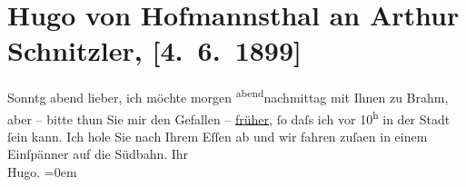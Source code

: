 

         
         \renewcommand{\erwaehntePersonen}{Personen: Otto Brahm}
         \renewcommand{\erwaehnteOrte}{Orte: Südbahnhof, Wien}
         \renewcommand{\erwaehnteWerke}{}
               \section[Hugo von Hofmannsthal an Arthur Schnitzler, {[}4. 6. 1899{]}]{ Hugo von Hofmannsthal an Arthur Schnitzler, {[}4. 6. 1899{]}}\nopagebreak{}\rehead{ }\begin{ledgroupsized}[t]{13cm}\normalsize\beginnumbering \toendnotes[C]{\smallbreak\pagebreak[2]} 
\pstart
           \raggedleft{}{\pb}Sonntg abend\pend
           \pstart
           lieber, ich möchte morgen \substVorne{}\textsuperscript{abend}\substDazwischen{}nachmittag\substHinten{} mit Ihnen zu Brahm, aber – bitte thun
               Sie mir den Gefallen – \uline{früher}, ſo daſs ich vor
                     10\textsuperscript{h} in der Stadt ſein kann. Ich hole Sie nach Ihrem Eſſen ab und wir fahren
                  zuſa{\geminationm}en in einem Einſpänner auf die Südbahn.\pend
           \pstart
           Ihr{\\[\baselineskip]}\spacefill\mbox{Hugo.}\pend
           \leftskip=0em{}
         
         \endnumbering{}\end{ledgroupsized}  \newcommand{\dateiname}{L00922}\newcommand{\titel}{Hugo von Hofmannsthal an Arthur Schnitzler, [4. 6. 1899]}\newcommand{\editorInnen}{Martin Anton Müller und Gerd-Hermann Susen}
      